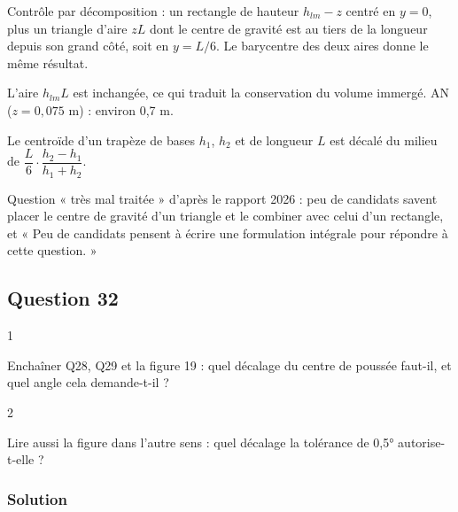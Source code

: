 \documentclass[11pt,a4paper]{article}
\newcommand{\equationajustee}[1]{%
  \sbox{\boiteequation}{$\displaystyle #1$}%
  \ifdim\wd\boiteequation>\linewidth
    \[\resizebox{\linewidth}{!}{\usebox{\boiteequation}}\]%
  \else
    \[#1\]%
  \fi}
\begin{document}
\equationajustee{\boxed{\Delta y_{C_{P_A}}=\frac{z\,L}{6\,h_{lm}}}}

Contrôle par décomposition : un rectangle de hauteur \(h_{lm}-z\) centré en \(y=0\), plus un triangle d'aire \(zL\) dont le centre de gravité est au tiers de la longueur depuis son grand côté, soit en \(y=L/6\). Le barycentre des deux aires donne le même résultat.

L'aire \(h_{lm}L\) est inchangée, ce qui traduit la conservation du volume immergé. AN (\(z=0{,}075\) m) : environ 0,7 m.

\begin{methode}

Le centroïde d'un trapèze de bases \(h_1\), \(h_2\) et de longueur \(L\) est décalé du milieu de \(\dfrac{L}{6}\cdot\dfrac{h_2-h_1}{h_1+h_2}\).

\end{methode}

\begin{jury}

Question « très mal traitée » d'après le rapport 2026 : peu de candidats savent placer le centre de gravité d'un triangle et le combiner avec celui d'un rectangle, et « Peu de candidats pensent à écrire une formulation intégrale pour répondre à cette question. »

\end{jury}

\hypertarget{question-32}{%
\subsection{Question 32}\label{question-32}}

\begin{indication}{1}

Enchaîner Q28, Q29 et la figure 19 : quel décalage du centre de poussée faut-il, et quel angle cela demande-t-il ?

\end{indication}

\begin{indication}{2}

Lire aussi la figure dans l'autre sens : quel décalage la tolérance de 0,5° autorise-t-elle ?

\end{indication}

\hypertarget{solution-31}{%
\subsubsection{Solution}\label{solution-31}}
\end{document}
